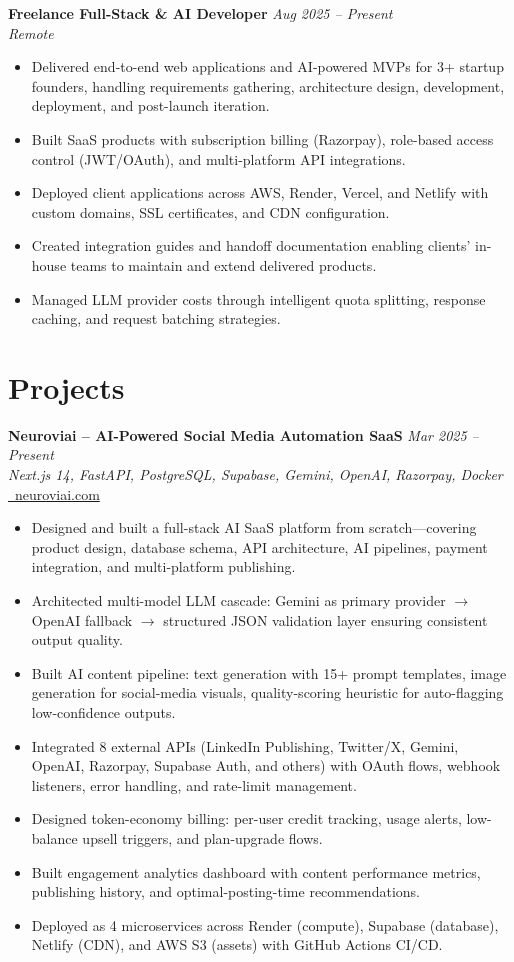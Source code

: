 \documentclass[11pt]{article}
\begin{document}
\textbf{Freelance Full-Stack \& AI Developer} \hfill \textit{Aug 2025 -- Present} \\
\textit{Remote}
\begin{itemize}
\item Delivered end-to-end web applications and AI-powered MVPs for 3+ startup founders, handling requirements gathering, architecture design, development, deployment, and post-launch iteration.
\item Built SaaS products with subscription billing (Razorpay), role-based access control (JWT/OAuth), and multi-platform API integrations.
\item Deployed client applications across AWS, Render, Vercel, and Netlify with custom domains, SSL certificates, and CDN configuration.
\item Created integration guides and handoff documentation enabling clients' in-house teams to maintain and extend delivered products.
\item Managed LLM provider costs through intelligent quota splitting, response caching, and request batching strategies.
\end{itemize}

\section*{Projects}

\textbf{Neuroviai -- AI-Powered Social Media Automation SaaS} \hfill \textit{Mar 2025 -- Present} \\
\textit{Next.js 14, FastAPI, PostgreSQL, Supabase, Gemini, OpenAI, Razorpay, Docker} \hfill \href{https://neuroviai.com}{\faGlobe\ neuroviai.com}
\begin{itemize}
\item Designed and built a full-stack AI SaaS platform from scratch---covering product design, database schema, API architecture, AI pipelines, payment integration, and multi-platform publishing.
\item Architected multi-model LLM cascade: Gemini as primary provider $\rightarrow$ OpenAI fallback $\rightarrow$ structured JSON validation layer ensuring consistent output quality.
\item Built AI content pipeline: text generation with 15+ prompt templates, image generation for social-media visuals, quality-scoring heuristic for auto-flagging low-confidence outputs.
\item Integrated 8 external APIs (LinkedIn Publishing, Twitter/X, Gemini, OpenAI, Razorpay, Supabase Auth, and others) with OAuth flows, webhook listeners, error handling, and rate-limit management.
\item Designed token-economy billing: per-user credit tracking, usage alerts, low-balance upsell triggers, and plan-upgrade flows.
\item Built engagement analytics dashboard with content performance metrics, publishing history, and optimal-posting-time recommendations.
\item Deployed as 4 microservices across Render (compute), Supabase (database), Netlify (CDN), and AWS S3 (assets) with GitHub Actions CI/CD.
\end{itemize}
\end{document}
